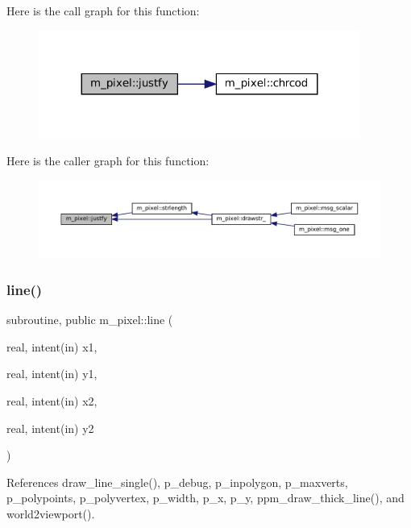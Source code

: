 Here is the call graph for this function\+:
\nopagebreak
\begin{figure}[H]
\begin{center}
\leavevmode
\includegraphics[width=299pt]{namespacem__pixel_a7b08886c913b47694edeb60fa747afc4_cgraph}
\end{center}
\end{figure}
Here is the caller graph for this function\+:
\nopagebreak
\begin{figure}[H]
\begin{center}
\leavevmode
\includegraphics[width=350pt]{namespacem__pixel_a7b08886c913b47694edeb60fa747afc4_icgraph}
\end{center}
\end{figure}
\mbox{\label{namespacem__pixel_a491951b89e60d0d40d67f22d987da894}} 
\subsubsection{\texorpdfstring{line()}{line()}}
{\footnotesize\ttfamily subroutine, public m\+\_\+pixel\+::line (\begin{DoxyParamCaption}\item[{real, intent(in)}]{x1,  }\item[{real, intent(in)}]{y1,  }\item[{real, intent(in)}]{x2,  }\item[{real, intent(in)}]{y2 }\end{DoxyParamCaption})}



References draw\+\_\+line\+\_\+single(), p\+\_\+debug, p\+\_\+inpolygon, p\+\_\+maxverts, p\+\_\+polypoints, p\+\_\+polyvertex, p\+\_\+width, p\+\_\+x, p\+\_\+y, ppm\+\_\+draw\+\_\+thick\+\_\+line(), and world2viewport().

